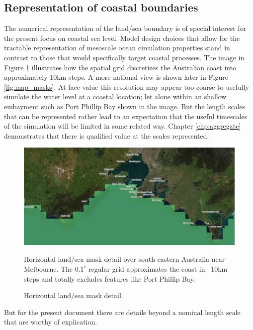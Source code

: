 \subsection{Representation of coastal boundaries}
The numerical representation of the land/sea boundary is of special interest for the present focus on coastal sea level.
Model design choices that allow for the tractable representation of mesoscale ocean circulation properties stand in contrast to those that would specifically target coastal processes.
The image in Figure \ref{fig:oceanmapsMaskDetail} illustrates how the \BL{} spatial grid discretizes the Australian coast into approximately 10km steps.  A more national view is shown later in Figure \ref{fig:map_masks}.
At face value this resolution may appear too coarse to usefully simulate the water level at a coastal location; let alone within an shallow embayment such as Port Phillip Bay shown in the image.    But the length scales that can be represented rather lead to an expectation that the useful timescales of the simulation will be limited in some related way.   Chapter \ref{chp:aggregate} demonstrates that there is qualified value at the scales represented.
\begin{figure}[H]
    \begin{center}
    \includegraphics[width=\figwidthBig]{figures/images/oceanmapsMaskVic.png}
    \caption{Horizontal land/sea mask detail.}
            {Horizontal land/sea mask detail over south eastern Australia near Melbourne. The $0.1^{\circ}$ regular grid approximates the coast in ~10km steps and totally excludes features like Port Phillip Bay.}
    \end{center}
    \label{fig:oceanmapsMaskDetail}
\end{figure}
But for the present document there are details beyond a nominal length scale that are worthy of explication.

